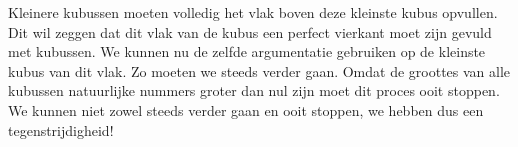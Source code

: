 
Kleinere kubussen moeten volledig het vlak boven deze kleinste kubus opvullen. Dit wil zeggen dat dit vlak van de kubus een perfect vierkant moet zijn gevuld met kubussen. We kunnen nu de zelfde argumentatie gebruiken op de kleinste kubus van dit vlak. Zo moeten we steeds verder gaan. Omdat de groottes van alle kubussen natuurlijke nummers groter dan nul zijn moet dit proces ooit stoppen. We kunnen niet zowel steeds verder gaan en ooit stoppen, we hebben dus een tegenstrijdigheid!








